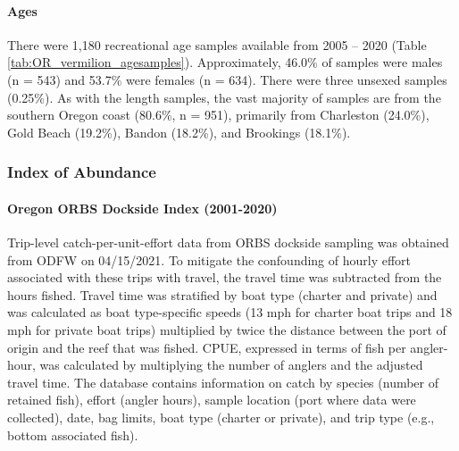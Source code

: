 \documentclass[11pt,
  english,
  a4paper,
]{article}
\begin{document}
\hypertarget{ages-1}{%
\paragraph{Ages}\label{ages-1}}

\leavevmode\tagmcend\tagstructend


There were 1,180 recreational age samples available from 2005 -- 2020 (Table \ref{tab:OR_vermilion_agesamples}). Approximately, 46.0\% of samples were males (n = 543) and 53.7\% were females (n = 634). There were three unsexed samples (0.25\%). As with the length samples, the vast majority of samples are from the southern Oregon coast (80.6\%, n = 951), primarily from Charleston (24.0\%), Gold Beach (19.2\%), Bandon (18.2\%), and Brookings (18.1\%).

\leavevmode\tagmcend\tagstructend\par


\hypertarget{index-of-abundance}{%
\subsubsection{Index of Abundance}\label{index-of-abundance}}

\leavevmode\tagmcend\tagstructend


\hypertarget{oregon-orbs-dockside-index-2001-2020}{%
\paragraph{Oregon ORBS Dockside Index (2001-2020)}\label{oregon-orbs-dockside-index-2001-2020}}

\leavevmode\tagmcend\tagstructend


Trip-level catch-per-unit-effort data from ORBS dockside sampling was obtained from ODFW on 04/15/2021. To mitigate the confounding of hourly effort associated with these trips with travel, the travel time was subtracted from the hours fished. Travel time was stratified by boat type (charter and private) and was calculated as boat type-specific speeds (13 mph for charter boat trips and 18 mph for private boat trips) multiplied by twice the distance between the port of origin and the reef that was fished. CPUE, expressed in terms of fish per angler-hour, was calculated by multiplying the number of anglers and the adjusted travel time. The database contains information on catch by species (number of retained fish), effort (angler hours), sample location (port where data were collected), date, bag limits, boat type (charter or private), and trip type (e.g., bottom associated fish).
\end{document}
